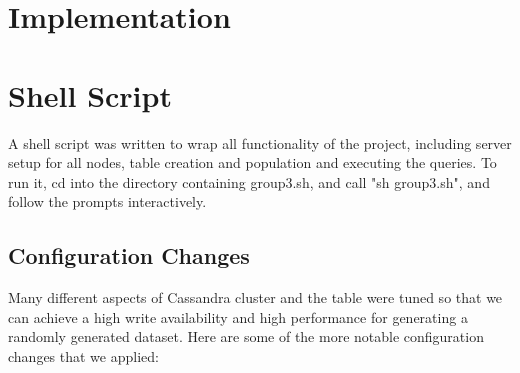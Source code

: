 \documentclass[letterpaper]{article}
\begin{document}
\section{Implementation}

\section{Shell Script}
A shell script was written to wrap all functionality of the project,
including server setup for all nodes, table creation and population and
executing the queries. To run it, cd into the directory containing group3.sh,
and call "sh group3.sh", and follow the prompts interactively.

\subsection{Configuration Changes}
Many different aspects of Cassandra cluster and the table were tuned so that we
can achieve a high write availability and high performance for generating
a randomly generated dataset. Here are some of the more notable configuration
changes that we applied:
\end{document}
